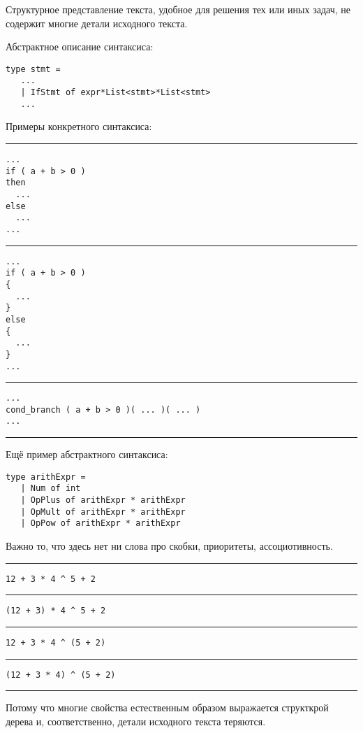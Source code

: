 Структурное представление текста, удобное для решения тех или иных задач, не содержит многие детали исходного текста.

Абстрактное описание синтаксиса:
\begin{verbatim}
type stmt =
   ...
   | IfStmt of expr*List<stmt>*List<stmt>
   ...
\end{verbatim}

Примеры конкретного синтаксиса:
\hrule
\begin{verbatim}
...
if ( a + b > 0 )
then
  ...
else
  ...
...
\end{verbatim}
\hrule
\begin{verbatim}
...
if ( a + b > 0 )
{
  ...
}
else
{
  ...
}
...
\end{verbatim}
\hrule
\begin{verbatim}
...
cond_branch ( a + b > 0 )( ... )( ... )
...
\end{verbatim}
\hrule

Ещё пример абстрактного синтаксиса:

\begin{verbatim}
type arithExpr =
   | Num of int
   | OpPlus of arithExpr * arithExpr
   | OpMult of arithExpr * arithExpr
   | OpPow of arithExpr * arithExpr
\end{verbatim}

Важно то, что здесь нет ни слова про скобки, приоритеты, ассоциотивность. 

\hrule
\begin{verbatim}
12 + 3 * 4 ^ 5 + 2
\end{verbatim}
\hrule
\begin{verbatim}
(12 + 3) * 4 ^ 5 + 2
\end{verbatim}
\hrule
\begin{verbatim}
12 + 3 * 4 ^ (5 + 2)
\end{verbatim}
\hrule
\begin{verbatim}
(12 + 3 * 4) ^ (5 + 2)
\end{verbatim}
\hrule

Потому что многие свойства естественным образом выражается структкрой дерева и, соответственно, детали исходного текста теряются.


